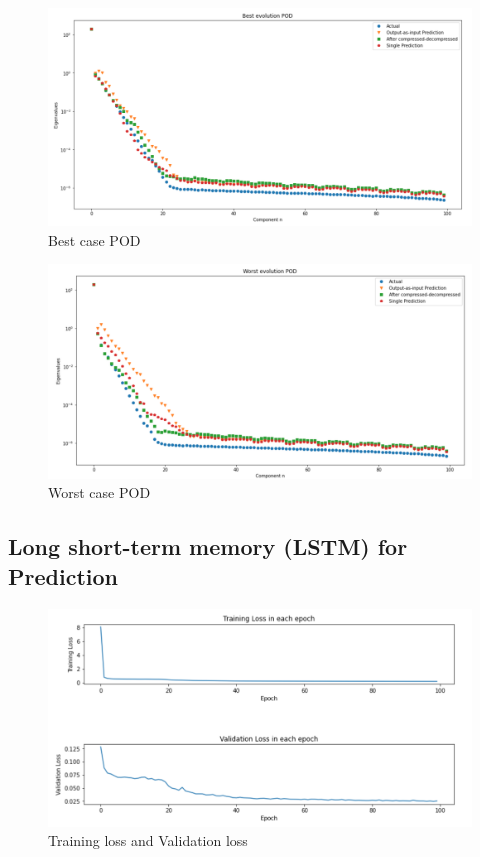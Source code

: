 \begin{figure}[H]
    \caption{Best case POD}
    \includegraphics[scale=0.5]{Report LaTeX/figures/mantle_convection_images/larger_dataset_interpolated/FNN_Best_POD.png}
\end{figure}

\begin{figure}[H]
    \caption{Worst case POD}
    \includegraphics[scale=0.5]{Report LaTeX/figures/mantle_convection_images/larger_dataset_interpolated/FNN_Worst_POD.png}
\end{figure}



\subsection{Long short-term memory (LSTM) for Prediction}

\begin{figure}[H]
    \caption{Training loss and Validation loss}
    \includegraphics[scale=0.6]{Report LaTeX/figures/mantle_convection_images/larger_dataset_interpolated/LSTM_trainingData.png}
\end{figure}

